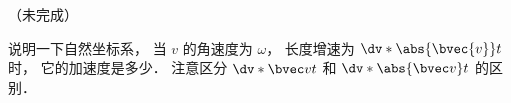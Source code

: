 

（未完成）

说明一下自然坐标系， 当 $v$ 的角速度为 $\omega$， 长度增速为 $\dv*{\abs{\bvec{v}}}{t}$ 时， 它的加速度是多少． 注意区分 $\dv*{\bvec v}{t}$ 和 $\dv*{\abs{\bvec v}}{t}$ 的区别．
